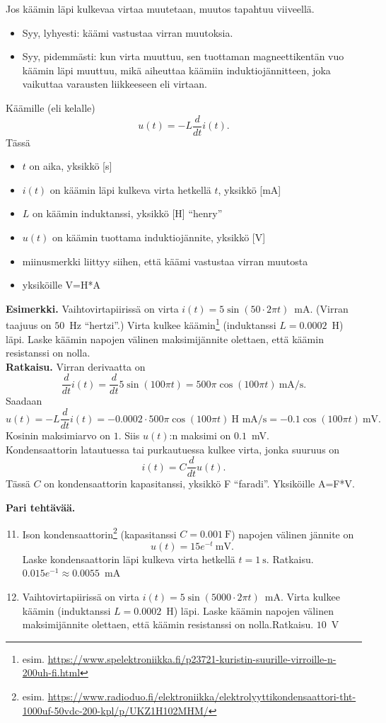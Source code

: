 \documentclass[10pt]{article}
\newcommand{\ratkaisu}[1]{\hfill{\color{blue}\quad\textrm{Ratkaisu. } #1}}
\begin{document}
Jos käämin läpi kulkevaa virtaa muutetaan, muutos tapahtuu viiveellä.
\begin{itemize}
\item Syy, lyhyesti: käämi vastustaa virran muutoksia.
\item Syy, pidemmästi: kun virta muuttuu, sen tuottaman magneettikentän vuo käämin läpi muuttuu, mikä aiheuttaa käämiin induktiojännitteen, joka vaikuttaa varausten liikkeeseen eli virtaan.
\end{itemize}
Käämille (eli kelalle)
$$
u(t)=-L\frac{d}{dt}i(t).
$$
Tässä
\begin{itemize}
\item $t$ on aika, yksikkö [s]
\item $i(t)$ on käämin läpi kulkeva virta hetkellä $t$, yksikkö [mA]
\item $L$ on käämin induktanssi, yksikkö [H] ``henry''
\item $u(t)$ on käämin tuottama induktiojännite, yksikkö [V]
\item miinusmerkki liittyy siihen, että käämi vastustaa virran muutosta
\item yksiköille V=H*A
\end{itemize}
\textbf{Esimerkki.}  Vaihtovirtapiirissä on virta $i(t)=5\sin(50\cdot 2\pi t)$~mA. (Virran taajuus on $50$~Hz ``hertzi''.) Virta kulkee käämin\footnote{esim. \url{https://www.spelektroniikka.fi/p23721-kuristin-suurille-virroille-n-200uh-fi.html}} (induktanssi $L=0.0002$~H) läpi. Laske käämin napojen välinen maksimijännite olettaen, että käämin resistanssi on nolla.\\

\noindent\textbf{Ratkaisu.} Virran derivaatta on
$$
\frac{d}{dt}i(t)
=\frac{d}{dt} 5\sin(100\pi t)
=500\pi\cos(100\pi t)~\textrm{mA/s}.
$$
Saadaan
$$
u(t)=-L\frac{d}{dt}i(t)
=-0.0002\cdot 500\pi\cos(100\pi t)~\textrm{H mA/s}
=-0.1\cos(100\pi t)~\textrm{mV}.
$$
Kosinin maksimiarvo on $1$. Siis $u(t)$:n maksimi on $0.1$~mV.\\[2mm]

Kondensaattorin latautuessa tai purkautuessa kulkee virta, jonka suuruus on
$$
i(t)
=C\frac{d}{dt}u(t).
$$
Tässä $C$ on kondensaattorin kapasitanssi, yksikkö F ``faradi''. Yksiköille A=F*V.

\textbf{Pari tehtävää.} 
\begin{enumerate}
\setcounter{enumi}{10}
\item Ison kondensaattorin\footnote{esim. \url{https://www.radioduo.fi/elektroniikka/elektrolyyttikondensaattori-tht-1000uf-50vdc-200-kpl/p/UKZ1H102MHM/}} (kapasitanssi $C=0.001~\textrm{F}$) napojen välinen jännite on
$$
u(t)=15e^{-t}~\textrm{mV}.
$$
Laske kondensaattorin läpi kulkeva virta hetkellä $t=1~\textrm{s}$.
\ratkaisu{$0.015e^{-1}\approx 0.0055$~mA}
\item Vaihtovirtapiirissä on virta $i(t)=5\sin(5000\cdot 2\pi t)$~mA. Virta kulkee käämin (induktanssi $L=0.0002$~H) läpi. Laske käämin napojen välinen maksimijännite olettaen, että käämin resistanssi on nolla.\ratkaisu{$10$~V}
\end{enumerate}
\end{document}
